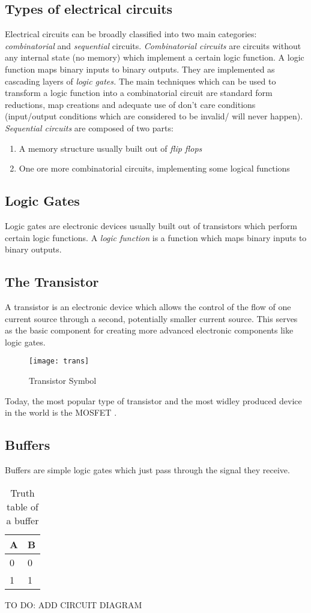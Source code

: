 \subsection{Types of electrical circuits}
Electrical circuits can be broadly classified into two main categories: \emph{combinatorial} and \emph{sequential} circuits. \emph{Combinatorial circuits} are circuits without any internal state (no memory) which implement a certain logic function. A logic function maps binary inputs to binary outputs. They are implemented as cascading layers of \emph{logic gates.} The main techniques which can be used to transform a logic function into a combinatorial circuit are standard form reductions, map creations and adequate use of don't care conditions (input/output conditions which are considered to be invalid/ will never happen). \emph{Sequential circuits} are composed of two parts:
\begin{enumerate}
  \item A memory structure usually built out of \emph{flip flops}
  \item One ore more combinatorial circuits, implementing some logical functions
\end{enumerate}

\subsection{Logic Gates}
Logic gates are electronic devices usually built out of transistors which perform certain logic functions.
A \emph{logic function} is a function which maps binary inputs to binary outputs.

\subsection{The Transistor}
A transistor is an electronic device which allows the control of the flow of one current source through a second, potentially smaller current source. This serves as the basic component for creating more advanced electronic components like logic gates.
\begin{figure}[h]
  \centering
  \texttt{[image: trans]}
  \caption{Transistor Symbol}
  \label{trans}
\end{figure}
Today, the most popular type of transistor and the most widley produced device in the world is the MOSFET \cite{chm2019mosfet}.


\subsection{Buffers}
Buffers are simple logic gates which just pass through the signal they receive.
\begin{table}[H]
\centering
\begin{tabular}{l|l}
\hline
\multicolumn{1}{|l|}{\textbf{A}} & \multicolumn{1}{l|}{\textbf{B}} \\ \hline
0                                & 0                               \\
1                                & 1
\end{tabular}
\caption{Truth table of a buffer}
\label{tab:buffer-table}
\end{table}
TO DO: ADD CIRCUIT DIAGRAM

